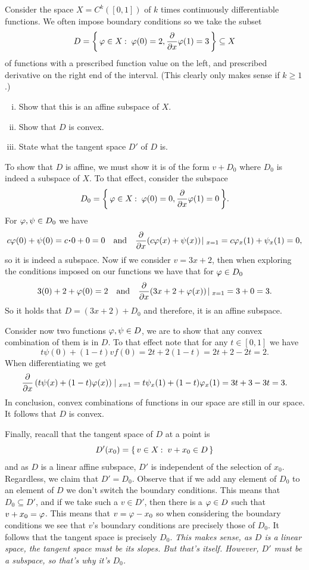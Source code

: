 \documentclass[12pt]{memoir}
\begin{document}
\begin{Ej}
    Consider the space $X=C^k([0,1])$ of $k$ times continuously differentiable functions. We often impose boundary conditions so we take the subset 
    $$D=\Set{\vf\in X\:\ \vf(0)=2,\pdv{x}\vf(1)=3}\subseteq X$$
    of functions with a prescribed function value on the left, and prescribed derivative on the right end of the
    interval. (This clearly only makes sense if $k\geq 1$.)
    \begin{enumerate}[i)]
        \item Show that this is an affine subspace of $X$.
        \item Show that $D$ is convex.
        \item State what the tangent space $D'$ of $D$ is. 
    \end{enumerate}
\end{Ej}

\begin{ptcbr}
    To show that $D$ is affine, we must show it is of the form $v+D_0$ where $D_0$ is indeed a subspace of $X$. To that effect, consider the subspace 
    $$D_0=\Set{\vf\in X\:\ \vf(0)=0,\pdv{x}\vf(1)=0}.$$
    For $\varphi,\psi\in D_0$ we have
    $$c\vf(0)+\psi(0)=c\.0+0=0\word{and}\pdv{x}(c\vf(x)+\psi(x))\!\mid_{x=1}=c\vf_x(1)+\psi_x(1)=0,$$
    so it is indeed a subspace. Now if we consider $v=3x+2$, then when exploring the conditions imposed on our functions we have that for $\varphi\in D_0$
    $$3(0)+2+\vf(0)=2\word{and}\pdv{x}(3x+2+\vf(x))\!\mid_{x=1}=3+0=3.$$
    So it holds that $D=(3x+2)+D_0$ and therefore, it is an affine subspace.\par 
    Consider now two functions $\varphi,\psi\in D$, we are to show that any convex combination of them is in $D$. To that effect note that for any $t\in[0,1]$ we have 
    $$t\psi(0)+(1-t)vf(0)=2t+2(1-t)=2t+2-2t=2.$$
    When differentiating we get 
    $$\pdv{x}\left(t\psi(x)+(1-t)\vf(x)\right)\!\mid_{x=1}=t\psi_x(1)+(1-t)\vf_x(1)=3t+3-3t=3.$$
    In conclusion, convex combinations of functions in our space are still in our space. It follows that $D$ is convex.\par 
    Finally, reacall that the tangent space of $D$ at a point is 
    $$D'(x_0)=\set{v\in X\:\ v+x_0\in D}$$
    and as $D$ is a linear affine subspace, $D'$ is independent of the selection of $x_0$. Regardless, we claim that $D'=D_0$. Observe that if we add any element of $D_0$ to an element of $D$ we don't switch the boundary conditions. This means that $D_0\subseteq D'$, and if we take such a $v\in D'$, then there is a $\varphi\in D$ such that $v+x_0=\varphi$. This means that $v=\varphi-x_0$ so when considering the boundary conditions we see that $v$'s boundary conditions are precisely those of $D_0$. It follows that the tangent space is precisely $D_0$. \emph{This makes sense, as $D$ is a linear space, the tangent space must be its slopes. But that's itself. However, $D'$ must be a subspace, so that's why it's $D_0$.} 
\end{ptcbr}
\end{document}
